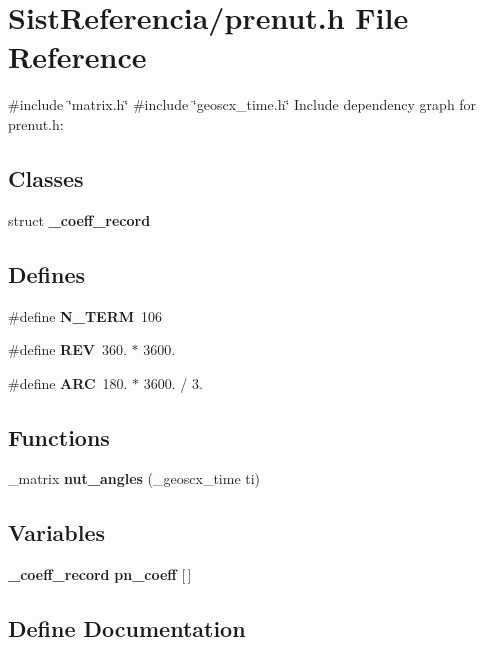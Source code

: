 \section{\-Sist\-Referencia/prenut.h \-File \-Reference}
\label{prenut_8h}
{\ttfamily \#include \char`\"{}matrix.\-h\char`\"{}}\*
{\ttfamily \#include \char`\"{}geoscx\-\_\-time.\-h\char`\"{}}\*
\-Include dependency graph for prenut.\-h\-:
\subsection*{\-Classes}
\begin{DoxyCompactItemize}
\item 
struct {\bf \-\_\-coeff\-\_\-record}
\end{DoxyCompactItemize}
\subsection*{\-Defines}
\begin{DoxyCompactItemize}
\item 
\#define {\bf \-N\-\_\-\-T\-E\-R\-M}~106
\item 
\#define {\bf \-R\-E\-V}~360. $\ast$ 3600.
\item 
\#define {\bf \-A\-R\-C}~180. $\ast$ 3600. / 3.
\end{DoxyCompactItemize}
\subsection*{\-Functions}
\begin{DoxyCompactItemize}
\item 
\-\_\-matrix {\bf nut\-\_\-angles} (\-\_\-geoscx\-\_\-time ti)
\end{DoxyCompactItemize}
\subsection*{\-Variables}
\begin{DoxyCompactItemize}
\item 
{\bf \-\_\-coeff\-\_\-record} {\bf pn\-\_\-coeff} [$\,$]
\end{DoxyCompactItemize}


\subsection{\-Define \-Documentation}
